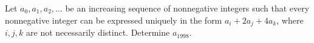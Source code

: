 Let $a_0, a_1, a_2, \ldots$ be an increasing sequence of nonnegative integers such that every nonnegative integer can be expressed uniquely in the form $a_i + 2a_j + 4a_k$, where $i, j, k$ are not necessarily distinct. Determine $a_{1998}$.
